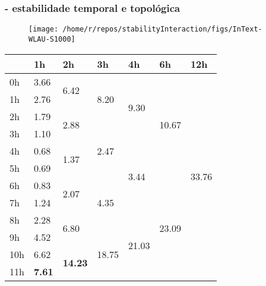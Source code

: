 \documentclass[10pt]{beamer}
\begin{document}
\begin{frame}
\frametitle{- estabilidade temporal e topológica}

\vspace{-.2cm}
\begin{figure} 
	\centering
	\texttt{[image: /home/r/repos/stabilityInteraction/figs/InText-WLAU-S1000]}
\end{figure}
\vspace{-.2cm}

	\begin{minipage}[t]{0.48\linewidth}
\begin{table}
	\tiny
\begin{center} 
	\begin{tabular}{| p{.2cm} || p{.37cm} | p{.37cm} | p{.37cm} | p{.37cm} | p{.37cm} | p{.37cm} |}\hline 
  & 1h & 2h & 3h & 4h & 6h & 12h \\\hline 
 0h  &\multirow{1}{*}{3.66 }   &\multirow{2}{*}{6.42 }   &\multirow{3}{*}{8.20 }   &\multirow{4}{*}{9.30 }   &\multirow{6}{*}{10.67 }   &\multirow{12}{*}{33.76 }  \\\cline{2-2} 
 1h  &\multirow{1}{*}{2.76 }   &   &   &   &   &  \\\cline{2-2}\cline{3-3} 
 2h  &\multirow{1}{*}{1.79 }   &\multirow{2}{*}{2.88 }   &   &   &   &  \\\cline{2-2}\cline{4-4} 
 3h  &\multirow{1}{*}{1.10 }   &   &\multirow{3}{*}{2.47 }   &   &   &  \\\cline{2-2}\cline{3-3}\cline{5-5} 
 4h  &\multirow{1}{*}{0.68 }   &\multirow{2}{*}{1.37 }   &   &\multirow{4}{*}{3.44 }   &   &  \\\cline{2-2} 
 5h  &\multirow{1}{*}{0.69 }   &   &   &   &   &  \\\cline{2-2}\cline{3-3}\cline{4-4}\cline{6-6} 
 6h  &\multirow{1}{*}{0.83 }   &\multirow{2}{*}{2.07 }   &\multirow{3}{*}{4.35 }   &   &\multirow{6}{*}{23.09 }   &  \\\cline{2-2} 
 7h  &\multirow{1}{*}{1.24 }   &   &   &   &   &  \\\cline{2-2}\cline{3-3}\cline{5-5} 
 8h  &\multirow{1}{*}{2.28 }   &\multirow{2}{*}{6.80 }   &   &\multirow{4}{*}{21.03 }   &   &  \\\cline{2-2}\cline{4-4} 
 9h  &\multirow{1}{*}{4.52 }   &   &\multirow{3}{*}{18.75 }   &   &   &  \\\cline{2-2}\cline{3-3} 
 10h  &\multirow{1}{*}{6.62 }   &\multirow{2}{*}{\textbf{14.23} }   &   &   &   &  \\\cline{2-2} 
 11h  &\multirow{1}{*}{\textbf{7.61} }   &   &   &   &   &  \\\cline{2-2}\cline{3-3}\cline{4-4}\cline{5-5}\cline{6-6}\cline{7-7} 

\end{tabular}
\end{center}
\end{table}
\end{minipage}
\end{frame}
\end{document}
